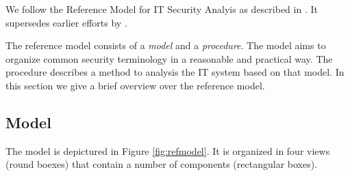 We follow the Reference Model for IT Security Analyis as described in \cite{Grimm}.
It supersedes earlier efforts by \cite{Avizienis}.

The reference model consists of a \emph{model} and a \emph{procedure}.
The model aims to organize common security terminology in a reasonable and practical way.
The procedure describes a method to analysis the IT system based on that model.
In this section we give a brief overview over the reference model.

\subsection{Model}



The model is depictured in Figure \ref{fig:refmodel}.
It is organized in four views (round boexes) that contain a number of components (rectangular boxes).




